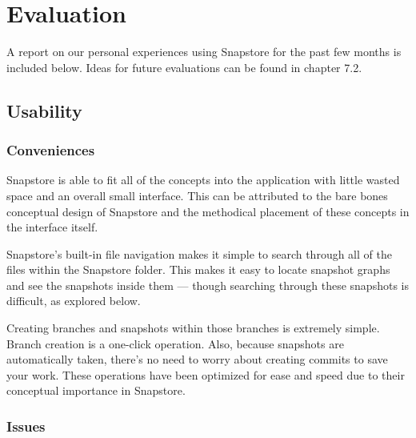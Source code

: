 \chapter{Evaluation}

A report on our personal experiences using Snapstore for the past few months is included below. Ideas for future evaluations can be found in chapter 7.2.

\section{Usability}

\subsection{Conveniences}


Snapstore is able to fit all of the concepts into the application with little wasted space and an overall small interface. This can be attributed to the bare bones conceptual design of Snapstore and the methodical placement of these concepts in the interface itself.


Snapstore's built-in file navigation makes it simple to search through all of the files within the Snapstore folder. This makes it easy to locate snapshot graphs and see the snapshots inside them --- though searching through these snapshots is difficult, as explored below.

Creating branches and snapshots within those branches is extremely simple. Branch creation is a one-click operation. Also, because snapshots are automatically taken, there's no need to worry about creating commits to save your work. These operations have been optimized for ease and speed due to their conceptual importance in Snapstore.

\subsection{Issues}


